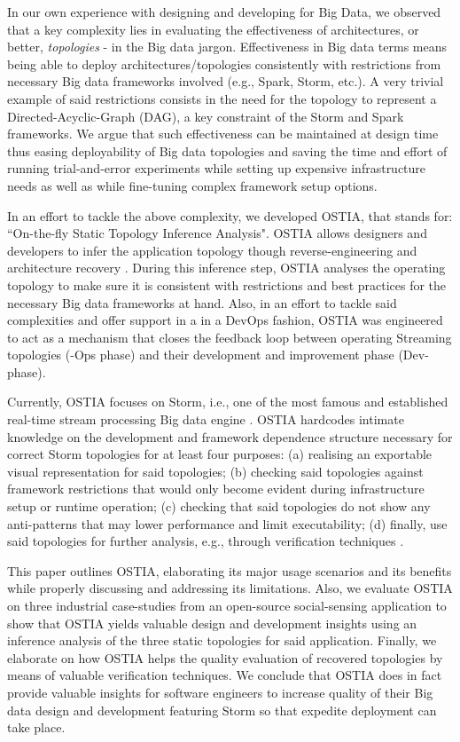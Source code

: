 In our own experience with designing and developing for Big Data, we observed that a key complexity lies in evaluating the effectiveness of architectures, or better, \emph{topologies} - in the Big data jargon. Effectiveness in Big data terms means being able to deploy architectures/topologies consistently with restrictions from necessary Big data frameworks involved (e.g., Spark, Storm, etc.). A very trivial example of said restrictions consists in the need for the topology to represent a Directed-Acyclic-Graph (DAG), a key constraint of the Storm and Spark frameworks.
We argue that such effectiveness can be maintained at design time thus easing deployability of Big data topologies and saving the time and effort of running trial-and-error experiments while setting up expensive infrastructure needs as well as while fine-tuning complex framework setup options.

In an effort to tackle the above complexity, we developed OSTIA, that stands for: ``On-the-fly Static Topology Inference Analysis". OSTIA allows designers and developers to infer the application topology though reverse-engineering and architecture recovery \cite{archrec}. During this inference step, OSTIA analyses the operating topology to make sure it is consistent with restrictions and best practices for the necessary Big data frameworks at hand. Also, in an effort to tackle said complexities and offer support in a  in a DevOps fashion, OSTIA was engineered to act as a mechanism that closes the feedback loop between operating Streaming topologies (-Ops phase) and their development and improvement phase (Dev- phase).

Currently, OSTIA focuses on Storm, i.e., one of the most famous and established real-time stream processing Big data engine \cite{storm}. OSTIA hardcodes intimate knowledge on the development and framework dependence structure necessary for correct Storm topologies for at least four purposes: (a) realising an exportable visual representation for said topologies; (b) checking said topologies against framework restrictions that would only become evident during infrastructure setup or runtime operation; (c) checking that said topologies do not show any anti-patterns \cite{patternoriented2000} that may lower performance and limit executability; (d) finally, use said topologies for further analysis, e.g., through verification techniques \cite{icsoft}.

This paper outlines OSTIA, elaborating its major usage scenarios and its benefits while properly discussing and addressing its limitations. Also, we evaluate OSTIA on three industrial case-studies from an open-source social-sensing application to show that OSTIA yields valuable design and development insights using an inference analysis of the three static topologies for said application. Finally, we elaborate on how OSTIA helps the quality evaluation of recovered topologies by means of valuable verification techniques. We conclude that OSTIA does in fact provide valuable insights for software engineers to increase quality of their Big data design and development featuring Storm so that expedite deployment can take place.


